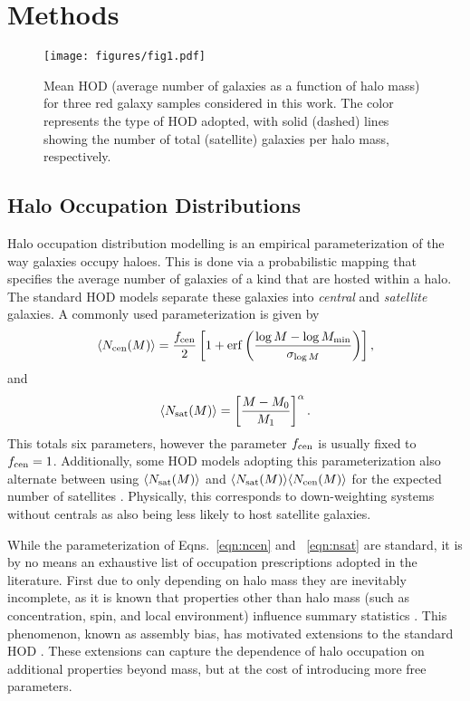 \documentclass[fleqn,usenatbib]{mnras}
\begin{document}
\section{Methods}
\label{sec:methods}
\begin{figure*}
    \centering
    \texttt{[image: figures/fig1.pdf]}
    \caption{Mean HOD (average number of galaxies as a function of halo mass) for three red galaxy samples considered in this work. The color represents the type of HOD adopted, with solid (dashed) lines showing the number of total (satellite) galaxies per halo mass, respectively. }
    \label{fig:hodplots}
\end{figure*}


\subsection{Halo Occupation Distributions}
\label{subsec:HOD}
Halo occupation distribution modelling is an empirical parameterization of the way galaxies occupy haloes. This is done via a probabilistic mapping that specifies the average number of galaxies of a kind that are hosted within a halo. The standard HOD models \citep{Berlind_2002,Zheng:2004id,Zheng:2007zg} separate these galaxies into \emph{central} and \emph{satellite} galaxies. A commonly used parameterization is given by 
\begin{equation}
\label{eqn:ncen}
    \langle N_{\rm cen} (M) \rangle = \frac{f_{\rm cen}}{2} \left [ 1 + {\rm erf} \left (\frac{\log M - \log M_{\rm min}}{\sigma_{\log M}} \right ) \right ],
\end{equation}
and 
\begin{equation}
\label{eqn:nsat}
    \langle N_{\rm sat} (M) \rangle = \left [ \frac{M - M_0}{M_1} \right]^\alpha.
\end{equation}
This totals six parameters, however the parameter $f_{\rm cen}$ is usually fixed to $f_{\rm cen} = 1$. Additionally, some HOD models adopting this parameterization also alternate between using $\langle N_{\rm sat} (M)\rangle$ and $\langle N_{\rm sat} (M) \rangle\langle N_{\rm cen} (M) \rangle$ for the expected number of satellites \citep[see e.g. discussion in][]{reddick2013}. Physically, this corresponds to down-weighting systems without centrals as also being less likely to host satellite galaxies. \par 
While the parameterization of Eqns.~\ref{eqn:ncen} and ~\ref{eqn:nsat} are standard, it is by no means an exhaustive list of occupation prescriptions adopted in the literature. First due to only depending on halo mass they are inevitably incomplete, as it is known that properties other than halo mass  (such as concentration, spin, and local environment) influence summary statistics \citep{Wechsler:2001cs, Gao:2005ca, Wechsler:2005gb,Dalal:2008zd,Mao:2017aym,Salcedo_2018,Chue_2018,Mansfield:2019ter}. This phenomenon, known as assembly bias, has motivated extensions to the standard HOD \citep{Hearin_2016, Yuan:2018qek}. These extensions can capture the dependence of halo occupation on additional properties beyond mass, but at the cost of introducing more free parameters. \par 
\end{document}
